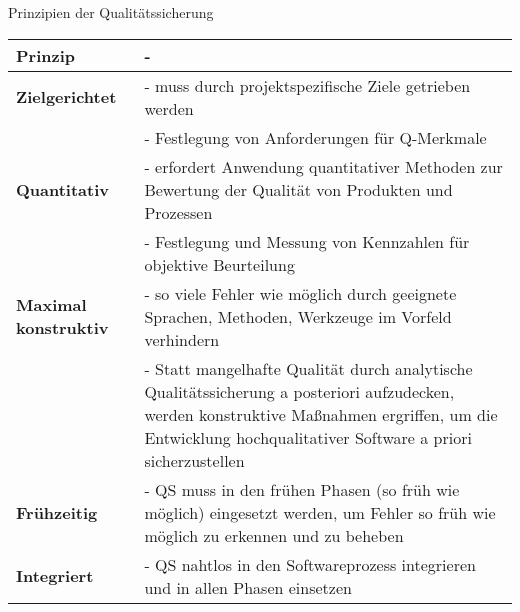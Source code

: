 \begin{defi}{Prinzipien der Qualitätssicherung}
    \begin{tabularx}{\textwidth}{|>{\bfseries}l|>{- }X|}
        \hline
        Prinzip                & \multicolumn{1}{l}{\bfseries Erläuterung}                                                                                                                                                                \\
        \hline
        \hline
        Zielgerichtet          & muss durch projektspezifische Ziele getrieben werden                                                                                                                                                     \\
                               & Festlegung von Anforderungen für Q-Merkmale                                                                                                                                                              \\
        \hline
        Quantitativ            & erfordert Anwendung quantitativer Methoden zur Bewertung der Qualität von Produkten und Prozessen                                                                                                        \\
                               & Festlegung und Messung von Kennzahlen für objektive Beurteilung                                                                                                                                          \\
        \hline
        Maximal konstruktiv    & so viele Fehler wie möglich durch geeignete Sprachen, Methoden, Werkzeuge im Vorfeld verhindern                                                                                                          \\
                               & Statt mangelhafte Qualität durch analytische Qualitätssicherung a posteriori aufzudecken, werden konstruktive Maßnahmen ergriffen, um die Entwicklung hochqualitativer Software a priori sicherzustellen \\
        \hline
        Frühzeitig             & QS muss in den frühen Phasen (so früh wie möglich) eingesetzt werden, um Fehler so früh wie möglich zu erkennen und zu beheben                                                                           \\
        \hline
        Integriert             & QS nahtlos in den Softwareprozess integrieren und in allen Phasen einsetzen                                                                                                                              \\

\end{tabularx}
\end{defi}
